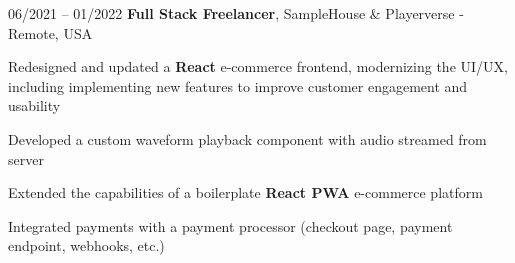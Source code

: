 

\begin{twocolentry}{
    06/2021 – 01/2022
}
\fontsize{11 pt}{11 pt}\textbf{Full Stack Freelancer}, SampleHouse \& Playerverse - Remote, USA\end{twocolentry}

\vspace{0.10 cm}
\begin{onecolentry}
   \begin{highlights}
       \item Redesigned and updated a \textbf{React} e-commerce frontend, modernizing the UI/UX, including implementing new features to improve customer engagement and usability
       \item Developed a custom waveform playback component with audio streamed from server
       \item Extended the capabilities of a boilerplate \textbf{React PWA} e-commerce platform
       \item Integrated payments with a payment processor (checkout page, payment endpoint, webhooks, etc.)
   \end{highlights}
\end{onecolentry}
